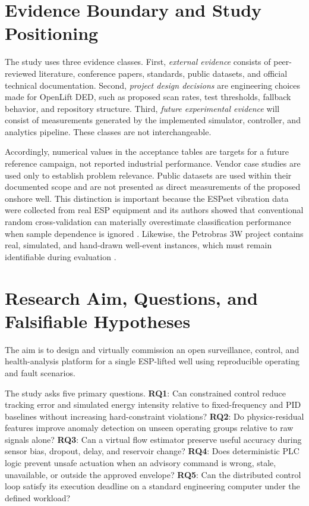 \documentclass[conference]{IEEEtran}
\begin{document}
\section{Evidence Boundary and Study Positioning}
The study uses three evidence classes. First, \emph{external evidence} consists of peer-reviewed literature, conference papers, standards, public datasets, and official technical documentation. Second, \emph{project design decisions} are engineering choices made for OpenLift DED, such as proposed scan rates, test thresholds, fallback behavior, and repository structure. Third, \emph{future experimental evidence} will consist of measurements generated by the implemented simulator, controller, and analytics pipeline. These classes are not interchangeable.

Accordingly, numerical values in the acceptance tables are targets for a future reference campaign, not reported industrial performance. Vendor case studies are used only to establish problem relevance. Public datasets are used within their documented scope and are not presented as direct measurements of the proposed onshore well. This distinction is important because the ESPset vibration data were collected from real ESP equipment and its authors showed that conventional random cross-validation can materially overestimate classification performance when sample dependence is ignored \cite{varejao2024}. Likewise, the Petrobras 3W project contains real, simulated, and hand-drawn well-event instances, which must remain identifiable during evaluation \cite{vargas2019,vargas2026}.

\section{Research Aim, Questions, and Falsifiable Hypotheses}
The aim is to design and virtually commission an open surveillance, control, and health-analysis platform for a single ESP-lifted well using reproducible operating and fault scenarios.

The study asks five primary questions. \textbf{RQ1}: Can constrained control reduce tracking error and simulated energy intensity relative to fixed-frequency and PID baselines without increasing hard-constraint violations? \textbf{RQ2}: Do physics-residual features improve anomaly detection on unseen operating groups relative to raw signals alone? \textbf{RQ3}: Can a virtual flow estimator preserve useful accuracy during sensor bias, dropout, delay, and reservoir change? \textbf{RQ4}: Does deterministic PLC logic prevent unsafe actuation when an advisory command is wrong, stale, unavailable, or outside the approved envelope? \textbf{RQ5}: Can the distributed control loop satisfy its execution deadline on a standard engineering computer under the defined workload?
\end{document}
